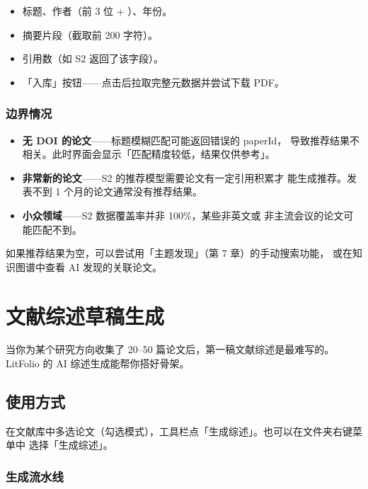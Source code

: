 \begin{itemize}
  \item 标题、作者（前 3 位 + ）、年份。
  \item 摘要片段（截取前 200 字符）。
  \item 引用数（如 S2 返回了该字段）。
  \item 「入库」按钮——点击后拉取完整元数据并尝试下载 PDF。
\end{itemize}

\subsection{边界情况}

\begin{itemize}
  \item \textbf{无 DOI 的论文}——标题模糊匹配可能返回错误的 paperId，
    导致推荐结果不相关。此时界面会显示「匹配精度较低，结果仅供参考」。
  \item \textbf{非常新的论文}——S2 的推荐模型需要论文有一定引用积累才
    能生成推荐。发表不到 1 个月的论文通常没有推荐结果。
  \item \textbf{小众领域}——S2 数据覆盖率并非 100\%，某些非英文或
    非主流会议的论文可能匹配不到。
\end{itemize}

\begin{tipbox}
如果推荐结果为空，可以尝试用「主题发现」（第 7 章）的手动搜索功能，
或在知识图谱中查看 AI 发现的关联论文。
\end{tipbox}

\chapter{文献综述草稿生成}
\label{ch:litreview}

当你为某个研究方向收集了 20--50 篇论文后，第一稿文献综述是最难写的。
LitFolio 的 AI 综述生成能帮你搭好骨架。

\section{使用方式}

在文献库中多选论文（勾选模式），工具栏点「生成综述」。也可以在文件夹右键菜单中
选择「生成综述」。


\subsection{生成流水线}

